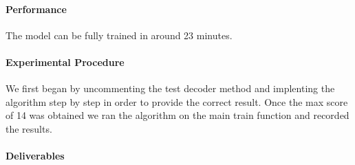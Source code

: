 \documentclass[11pt,letterpaper]{article}
\begin{document}
\paragraph{Performance} The model can be fully trained in around 23 minutes. 

\paragraph{Experimental Procedure} We first began by uncommenting the test decoder method and implenting the algorithm step by step in order to provide the correct result. Once the max score of 14 was obtained we ran the algorithm on the main train function and recorded the results. 

\paragraph{Deliverables}
\end{document}
